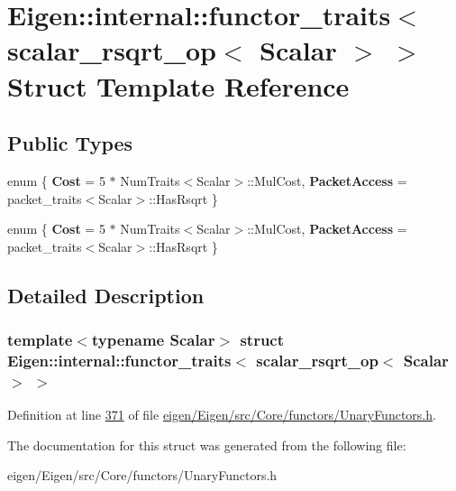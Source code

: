 \hypertarget{struct_eigen_1_1internal_1_1functor__traits_3_01scalar__rsqrt__op_3_01_scalar_01_4_01_4}{}\section{Eigen\+:\+:internal\+:\+:functor\+\_\+traits$<$ scalar\+\_\+rsqrt\+\_\+op$<$ Scalar $>$ $>$ Struct Template Reference}
\label{struct_eigen_1_1internal_1_1functor__traits_3_01scalar__rsqrt__op_3_01_scalar_01_4_01_4}
\subsection*{Public Types}
\begin{DoxyCompactItemize}
\item 
\mbox{\label{struct_eigen_1_1internal_1_1functor__traits_3_01scalar__rsqrt__op_3_01_scalar_01_4_01_4_a15a6207b12b6312dd4ddee4eb38963c7}} 
enum \{ {\bfseries Cost} = 5 $\ast$ Num\+Traits$<$Scalar$>$\+:\+:Mul\+Cost, 
{\bfseries Packet\+Access} = packet\+\_\+traits$<$Scalar$>$\+:\+:Has\+Rsqrt
 \}
\item 
\mbox{\label{struct_eigen_1_1internal_1_1functor__traits_3_01scalar__rsqrt__op_3_01_scalar_01_4_01_4_aebb8dcb988e5790d3404e1cf274ae90a}} 
enum \{ {\bfseries Cost} = 5 $\ast$ Num\+Traits$<$Scalar$>$\+:\+:Mul\+Cost, 
{\bfseries Packet\+Access} = packet\+\_\+traits$<$Scalar$>$\+:\+:Has\+Rsqrt
 \}
\end{DoxyCompactItemize}


\subsection{Detailed Description}
\subsubsection*{template$<$typename Scalar$>$\newline
struct Eigen\+::internal\+::functor\+\_\+traits$<$ scalar\+\_\+rsqrt\+\_\+op$<$ Scalar $>$ $>$}



Definition at line \hyperlink{eigen_2_eigen_2src_2_core_2functors_2_unary_functors_8h_source_l00371}{371} of file \hyperlink{eigen_2_eigen_2src_2_core_2functors_2_unary_functors_8h_source}{eigen/\+Eigen/src/\+Core/functors/\+Unary\+Functors.\+h}.



The documentation for this struct was generated from the following file\+:\begin{DoxyCompactItemize}
\item 
eigen/\+Eigen/src/\+Core/functors/\+Unary\+Functors.\+h\end{DoxyCompactItemize}
